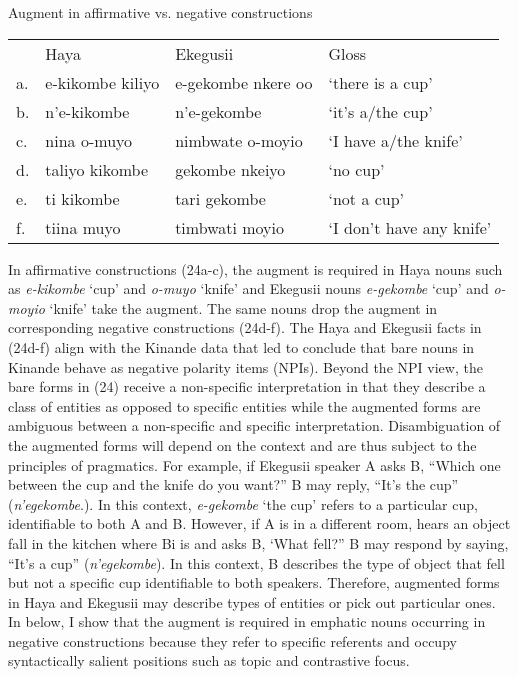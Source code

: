 \documentclass[output=paper]{langscibook}
\begin{document}
\begin{exe}
\ex Augment in affirmative vs. negative constructions \\
\label{hayagusii24}
\begin{tabular}{llll}
        &     Haya	&		Ekegusii	&		Gloss		 \\
a. &	e-kikombe kiliyo &	e-gekombe nkere oo	&	‘there is a cup’ 	\\
b. &	n’e-kikombe	&	n’e-gekombe		&	‘it’s a/the cup’ \\
c. &	nina o-muyo &		nimbwate o-moyio	&	‘I have a/the knife’	 \\
d. &	taliyo kikombe	&gekombe nkeiyo	&	‘no cup’ \\ 
e. &	ti kikombe	&	tari gekombe	&		‘not a cup’	 \\	
f. &	tiina muyo	&	timbwati moyio	&	‘I don’t have any knife’ \\
\end{tabular}
\end{exe}
In affirmative constructions (24a-c), the augment is required in Haya nouns such as \textit{e-kikombe} ‘cup’ and \textit{o-muyo} ‘knife’ and Ekegusii nouns \textit{e-gekombe} ‘cup’ and \textit{o-moyio} ‘knife’ take the augment. The same nouns drop the augment in corresponding negative constructions (24d-f). The Haya and Ekegusii facts in (24d-f) align with the Kinande data that led \citet{progovac1993non} to conclude that bare nouns in Kinande behave as negative polarity items (NPIs). Beyond the NPI view, the bare forms in (24) receive a non-specific interpretation in that they describe a class of entities as opposed to specific entities while the augmented forms are ambiguous between a non-specific and specific interpretation. Disambiguation of the augmented forms will depend on the context and are thus subject to the principles of pragmatics. For example, if Ekegusii speaker A asks B, “Which one between the cup and the knife do you want?” B may reply, “It’s the cup” (\textit{n’egekombe}.). In this context, \textit{e-gekombe} ‘the cup’ refers to a particular cup, identifiable to both A and B.  However, if A is in a different room, hears an object fall in the kitchen where Bi is and asks B, ‘What fell?” B may respond by saying, “It’s a cup” (\textit{n’egekombe}). In this context, B describes the type of object that fell but not a specific cup identifiable to both speakers. Therefore, augmented forms in Haya and Ekegusii may describe types of entities or pick out particular ones. In  below, I show that the augment is required in emphatic nouns occurring in negative constructions because they refer to specific referents and occupy syntactically salient positions such as topic and contrastive focus.
\end{document}
